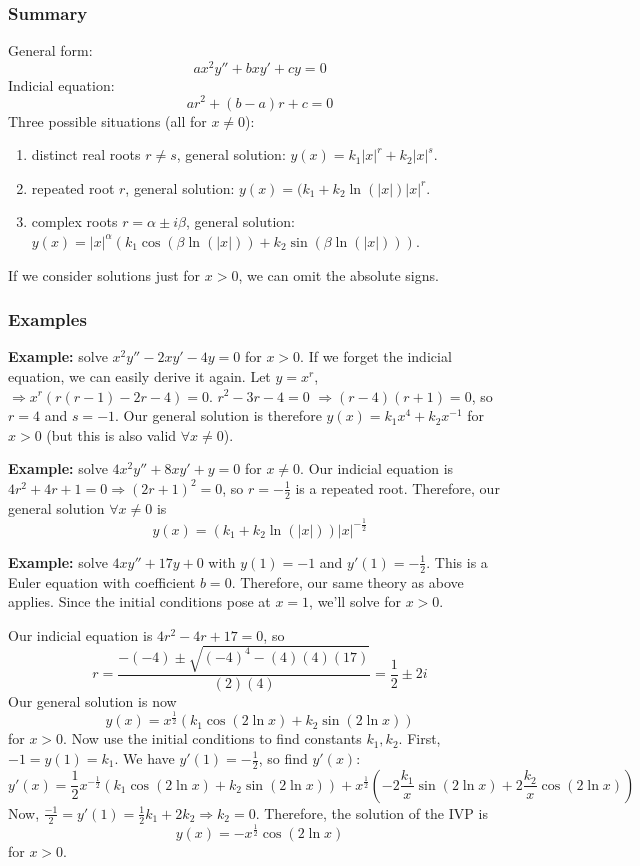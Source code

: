 \documentclass[11pt]{article}
\newcommand{\example}{\textbf{Example: }}
\begin{document}
\subsubsection{Summary}
	General form:
		$$ a x^2 y'' + b x y' + c y = 0 $$
	Indicial equation:
		$$ a r^2 + (b-a) r + c = 0 $$
	Three possible situations (all for $x \neq 0$):
		\begin{enumerate}
			\item distinct real roots $r \neq s$, general solution: $y(x) = k_1 |x|^r + k_2 |x|^s$.
			\item repeated root $r$, general solution: $y(x) = (k_1 + k_2 \ln(|x|) |x|^r$.
			\item complex roots $r = \alpha \pm i \beta$, general solution: $y(x) = |x|^{\alpha} (k_1 \cos(\beta \ln(|x|)) + k_2 \sin(\beta \ln(|x|)))$.
		\end{enumerate}
	If we consider solutions just for $x > 0$, we can omit the absolute signs.

\subsubsection{Examples}
	\example solve $x^2 y'' - 2 x y' - 4y = 0$ for $x > 0$. If we forget the indicial equation, we can easily derive it again. Let $y = x^r$, $\Rightarrow x^r (r (r - 1) - 2r - 4) = 0$. $r^2 - 3r - 4 = 0$ $\Rightarrow (r - 4)(r + 1) = 0$, so $r = 4$ and $s = -1$. Our general solution is therefore $y(x) = k_1 x^4 + k_2 x^{-1}$ for $x>0$ (but this is also valid $\forall x \neq 0$).

	\example solve $4x^2 y'' + 8xy' + y = 0$ for $x \neq 0$. Our indicial equation is $4 r^2 + 4r + 1 = 0 \Rightarrow (2r + 1)^2 = 0$, so $r = - \frac{1}{2}$ is a repeated root. Therefore, our general solution $\forall x \neq 0$ is
		$$ y(x) = (k_1 + k_2 \ln(|x|))|x|^{-\frac{1}{2}} $$

	\example solve $4xy'' + 17y + 0$ with $y(1) = -1$ and $y'(1) = -\frac{1}{2}$. This is a Euler equation with coefficient $b = 0$. Therefore, our same theory as above applies. Since the initial conditions pose at $x = 1$, we'll solve for $x > 0$.

	Our indicial equation is $4 r^2 - 4r + 17 = 0$, so
		$$ r = \frac{-(-4) \pm \sqrt{(-4)^4 - (4)(4)(17)}}{(2)(4)} = \frac{1}{2} \pm 2 i $$
	Our general solution is now
		$$ y(x) = x^{\frac{1}{2}} (k_1 \cos(2 \ln x) + k_2 \sin(2 \ln x)) $$
	for $x > 0$. Now use the initial conditions to find constants $k_1, k_2$. First, $-1 = y(1) = k_1$. We have $y'(1) = -\frac{1}{2}$, so find $y'(x)$:
		$$ y'(x) = \frac{1}{2} x^{-\frac{1}{2}} (k_1 \cos(2 \ln x) + k_2 \sin(2 \ln x)) + x^{\frac{1}{2}}(-2 \frac{k_1}{x} \sin(2 \ln x) + 2 \frac{k_2}{x} \cos(2 \ln x)) $$
	Now, $\frac{-1}{2} = y'(1) = \frac{1}{2} k_1 + 2 k_2 \Rightarrow k_2 = 0$. Therefore, the solution of the IVP is
		$$ y(x) = - x^{\frac{1}{2}} \cos(2 \ln x) $$
	for $x > 0$.
\end{document}
